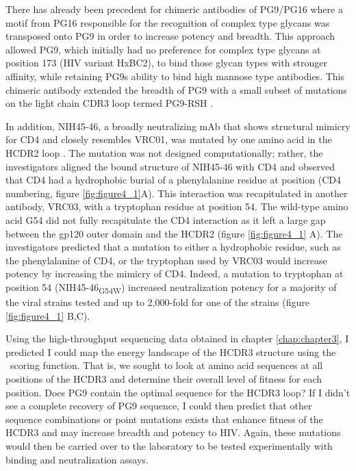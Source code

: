 There has already been precedent for chimeric antibodies of PG9/PG16 where a motif from PG16 responsible for the recognition of complex type glycans was transposed onto PG9 in order to increase potency and breadth. This approach allowed PG9, which initially had no preference for complex type glycans at position 173 (HIV variant HxBC2), to bind those glycan types with stronger affinity, while retaining PG9s ability to bind high mannose type antibodies. This chimeric antibody extended the breadth of PG9 with a small subset of mutations on the light chain CDR3 loop termed PG9-RSH \citep{Pancera:2013ev}.

In addition, NIH45-46, a broadly neutralizing mAb that shows structural mimicry for CD4 and closely resembles VRC01, was mutated by one amino acid in the HCDR2 loop \citep{Scheid:2011js,Diskin:2011hl}. The mutation was not designed computationally; rather, the investigators aligned the bound structure of NIH45-46 with CD4 and observed that CD4 had a hydrophobic burial of a phenylalanine residue at position (CD4 numbering, figure \ref{fig:figure4_1}A). This interaction was recapitulated in another antibody, VRC03, with a tryptophan residue at position 54. The wild-type amino acid G54 did not fully recapitulate the CD4 interaction as it left a large gap between the gp120 outer domain and the HCDR2 (figure \ref{fig:figure4_1} A). The investigators predicted that a mutation to either a hydrophobic residue, such as the phenylalanine of CD4, or the tryptophan used by VRC03 would increase potency by increasing the mimicry of CD4. Indeed, a mutation to tryptophan at position 54 (NIH45-46\textsubscript{G54W}) increased neutralization potency for a majority of the viral strains tested and up to 2,000-fold for one of the strains (figure \ref{fig:figure4_1} B,C).

Using the high-throughput sequencing data obtained in chapter \ref{chap:chapter3}, I predicted I could map the energy landscape of the HCDR3 structure using the \rosetta~scoring function. That is, we sought to look at amino acid sequences at all positions of the HCDR3 and determine their overall level of fitness for each position. Does PG9 contain the optimal sequence for the HCDR3 loop? If I didn't see a complete recovery of PG9 sequence, I could then predict that other sequence combinations or point mutations exists that enhance fitness of the HCDR3 and may increase breadth and potency to HIV. Again, these mutations would then be carried over to the laboratory to be tested experimentally with binding and neutralization assays.


